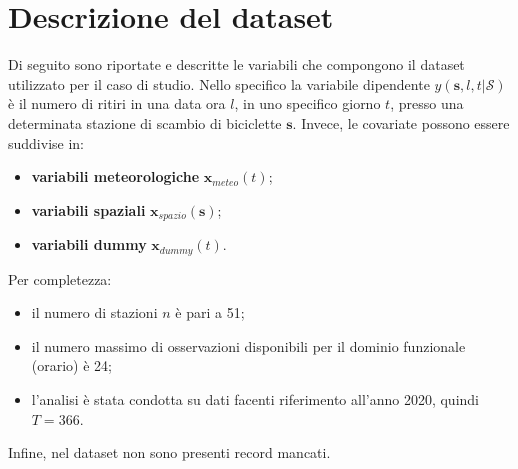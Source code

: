 \section[Descrizione del dataset]{Descrizione del dataset}
Di seguito sono riportate e descritte le variabili che compongono il dataset utilizzato per il caso di studio. Nello specifico la variabile dipendente $y(\mathbf{s}, l, t|\mathcal{S})$ è il numero di ritiri in una data ora $l$, in uno specifico giorno $t$, presso una determinata stazione di scambio di biciclette $\mathbf{s}$. Invece, le covariate possono essere suddivise in:
\begin{itemize}
	\item \textbf{variabili meteorologiche} $\mathbf{x}_{meteo}(t)$;
	\item \textbf{variabili spaziali} $\mathbf{x}_{spazio}(\mathbf{s})$;
	\item \textbf{variabili dummy} $\mathbf{x}_{dummy}(t)$.
\end{itemize}
Per completezza:
\begin{itemize}
	\item il numero di stazioni $n$ è pari a \num{51};
	\item il numero massimo di osservazioni disponibili per il dominio funzionale (orario) è \num{24};
	\item l'analisi è stata condotta su dati facenti riferimento all'anno \num{2020}, quindi $T=366$.
\end{itemize}
Infine, nel dataset non sono presenti record mancati.

